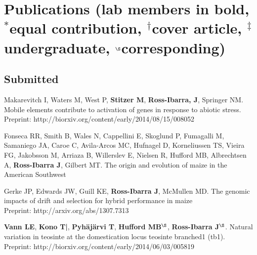 \documentclass[letterpaper]{article}
\renewenvironment{itemize}{
  \begin{list}{}{
    \setlength{\leftmargin}{1.5em}
  }
}{
  \end{list}
}
\begin{document}
\section*{Publications \small{(lab members in bold, $^*$equal contribution, $^\dagger$cover article, $^\ddagger$undergraduate, $^\S$corresponding)}} 
\subsection*{Submitted}
\begin{itemize}

\item Makarevitch I, Waters M, West P, {\bf Stitzer M}, {\bf Ross-Ibarra, J}, Springer NM. Mobile elements contribute to activation of genes in response to abiotic stress.  \\ Preprint: http://biorxiv.org/content/early/2014/08/15/008052

\item Fonseca RR, Smith B, Wales N, Cappellini E, Skoglund P, Fumagalli M, Samaniego JA, Caroe C, Avila-Arcos MC, Hufnagel D, Korneliussen TS, Vieira FG, Jakobsson M, Arriaza B, Willerslev E, Nielsen R, Hufford MB, Albrechtsen A,  {\bf Ross-Ibarra J}, Gilbert MT. The origin and evolution of maize in the American Southwest

\item Gerke JP, Edwards JW, Guill KE, {\bf Ross-Ibarra J}, McMullen MD.  The genomic impacts of drift and selection for hybrid performance in maize\\
Preprint: http://arxiv.org/abs/1307.7313
\\%

\item {\bf Vann LE}, {\bf Kono T|}, {\bf Pyh\"aj\"arvi T}, {\bf Hufford MB}$^\S$, {\bf Ross-Ibarra J}$^\S$. Natural variation in teosinte at the domestication locus teosinte branched1 (tb1). \\ Preprint: http://biorxiv.org/content/early/2014/06/03/005819



\end{itemize}
\end{document}

